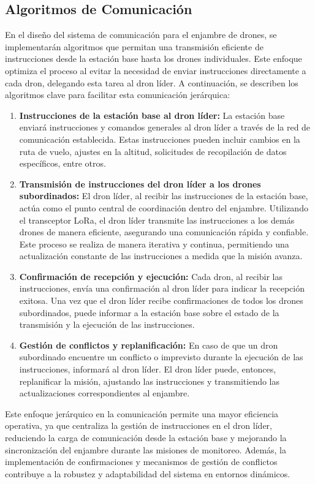 \subsection{Algoritmos de Comunicación}
En el diseño del sistema de comunicación para el enjambre de drones, se implementarán algoritmos que permitan una transmisión eficiente de instrucciones desde la estación base hasta los drones individuales. Este enfoque optimiza el proceso al evitar la necesidad de enviar instrucciones directamente a cada dron, delegando esta tarea al dron líder. A continuación, se describen los algoritmos clave para facilitar esta comunicación jerárquica:
\begin{enumerate}
\item \textbf{Instrucciones de la estación base al dron líder:} La estación base enviará instrucciones y comandos generales al dron líder a través de la red de comunicación establecida.
Estas instrucciones pueden incluir cambios en la ruta de vuelo, ajustes en la altitud, solicitudes de recopilación de datos específicos, entre otros.
\item \textbf{Transmisión de instrucciones del dron líder a los drones subordinados:} El dron líder, al recibir las instrucciones de la estación base, actúa como el punto central de coordinación dentro del enjambre.
Utilizando el transceptor LoRa, el dron líder transmite las instrucciones a los demás drones de manera eficiente, asegurando una comunicación rápida y confiable.
Este proceso se realiza de manera iterativa y continua, permitiendo una actualización constante de las instrucciones a medida que la misión avanza.
\item \textbf{Confirmación de recepción y ejecución:} Cada dron, al recibir las instrucciones, envía una confirmación al dron líder para indicar la recepción exitosa.
Una vez que el dron líder recibe confirmaciones de todos los drones subordinados, puede informar a la estación base sobre el estado de la transmisión y la ejecución de las instrucciones.
\item \textbf{Gestión de conflictos y replanificación:}
En caso de que un dron subordinado encuentre un conflicto o imprevisto durante la ejecución de las instrucciones, informará al dron líder.
El dron líder puede, entonces, replanificar la misión, ajustando las instrucciones y transmitiendo las actualizaciones correspondientes al enjambre.
\end{enumerate}
Este enfoque jerárquico en la comunicación permite una mayor eficiencia operativa, ya que centraliza la gestión de instrucciones en el dron líder, reduciendo la carga de comunicación desde la estación base y mejorando la sincronización del enjambre durante las misiones de monitoreo. Además, la implementación de confirmaciones y mecanismos de gestión de conflictos contribuye a la robustez y adaptabilidad del sistema en entornos dinámicos.

